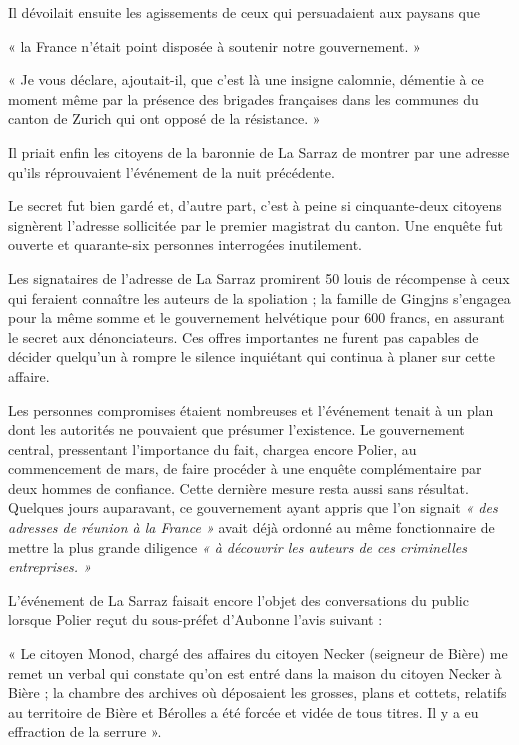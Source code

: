 \documentclass[french,twoside]{book} %
\newenvironment{quoteblock}%
  {\begin{quoting}}
  {\end{quoting}}
\newenvironment{quotebar}{%
    \def\FrameCommand{{\color{rubric!10!}\vrule width 0.5em} \hspace{0.9em}}%
    \def\OuterFrameSep{\itemsep} %
    \MakeFramed {\advance\hsize-\width \FrameRestore}
  }%
  {%
    \endMakeFramed
  }
\renewenvironment{quoteblock}%
  {%
    \savenotes
    \setstretch{0.9}
    \begin{quotebar}
  }
  {%
    \end{quotebar}
    \spewnotes
  }
\begin{document}
\noindent Il dévoilait ensuite les agissements de ceux qui persuadaient aux paysans que\par

\begin{quoteblock}
 \noindent « la France n’était point disposée à soutenir notre gouvernement. »\par
 « Je vous déclare, ajoutait-il, que c’est là une insigne calomnie, démentie à ce moment même par la présence des brigades françaises dans les communes du canton de Zurich qui ont opposé de la résistance. »
 \end{quoteblock}

\noindent Il priait enfin les citoyens de la baronnie de La Sarraz de montrer par une adresse qu’ils réprouvaient l’événement de la nuit précédente.\par
Le secret fut bien gardé et, d’autre part, c’est à peine si cinquante-deux citoyens signèrent l’adresse sollicitée par le premier magistrat du canton. Une enquête fut ouverte et quarante-six personnes interrogées inutilement.\par
Les signataires de l’adresse de La Sarraz promirent 50 louis de récompense à ceux qui feraient connaître les auteurs de la spoliation ; la famille de Gingjns s’engagea pour la même somme et le gouvernement helvétique pour 600 francs, en assurant le secret aux dénonciateurs. Ces offres importantes ne furent pas capables de décider quelqu’un à rompre le silence inquiétant qui continua à planer sur cette affaire.\par
Les personnes compromises étaient nombreuses et l’événement tenait à un plan dont les autorités ne pouvaient que présumer l’existence. Le gouvernement central, pressentant l’importance du fait, chargea encore Polier, au commencement de mars, de faire procéder à une enquête complémentaire par deux hommes de confiance. Cette dernière mesure resta aussi sans résultat. Quelques jours auparavant, ce gouvernement ayant appris que l’on signait \emph{« des adresses de réunion à la France »} avait déjà ordonné au même fonctionnaire de mettre la plus grande diligence \emph{« à découvrir les auteurs de ces criminelles entreprises. »}\par
L’événement de La Sarraz faisait encore l’objet des conversations du public lorsque Polier reçut du sous-préfet d’Aubonne l’avis suivant :\par

\begin{quoteblock}
 \noindent « Le citoyen Monod, chargé des affaires du citoyen Necker (seigneur de Bière) me remet un verbal qui constate qu’on est entré dans la maison du citoyen Necker à Bière ; la chambre des archives où déposaient les grosses, plans et cottets, relatifs au territoire de Bière et Bérolles a été forcée et vidée de tous titres. Il y a eu effraction de la serrure ».
 \end{quoteblock}
\end{document}
